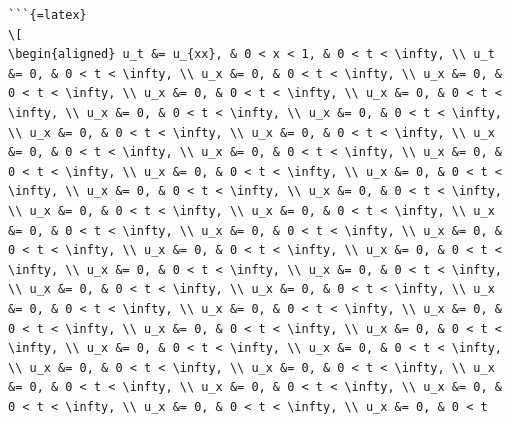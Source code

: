 \documentclass[
  ukrainian,
]{article}
\begin{document}
\begin{verbatim}
```{=latex}
\[
\begin{aligned} u_t &= u_{xx}, & 0 < x < 1, & 0 < t < \infty, \\ u_t &= 0, & 0 < t < \infty, \\ u_x &= 0, & 0 < t < \infty, \\ u_x &= 0, & 0 < t < \infty, \\ u_x &= 0, & 0 < t < \infty, \\ u_x &= 0, & 0 < t < \infty, \\ u_x &= 0, & 0 < t < \infty, \\ u_x &= 0, & 0 < t < \infty, \\ u_x &= 0, & 0 < t < \infty, \\ u_x &= 0, & 0 < t < \infty, \\ u_x &= 0, & 0 < t < \infty, \\ u_x &= 0, & 0 < t < \infty, \\ u_x &= 0, & 0 < t < \infty, \\ u_x &= 0, & 0 < t < \infty, \\ u_x &= 0, & 0 < t < \infty, \\ u_x &= 0, & 0 < t < \infty, \\ u_x &= 0, & 0 < t < \infty, \\ u_x &= 0, & 0 < t < \infty, \\ u_x &= 0, & 0 < t < \infty, \\ u_x &= 0, & 0 < t < \infty, \\ u_x &= 0, & 0 < t < \infty, \\ u_x &= 0, & 0 < t < \infty, \\ u_x &= 0, & 0 < t < \infty, \\ u_x &= 0, & 0 < t < \infty, \\ u_x &= 0, & 0 < t < \infty, \\ u_x &= 0, & 0 < t < \infty, \\ u_x &= 0, & 0 < t < \infty, \\ u_x &= 0, & 0 < t < \infty, \\ u_x &= 0, & 0 < t < \infty, \\ u_x &= 0, & 0 < t < \infty, \\ u_x &= 0, & 0 < t < \infty, \\ u_x &= 0, & 0 < t < \infty, \\ u_x &= 0, & 0 < t < \infty, \\ u_x &= 0, & 0 < t < \infty, \\ u_x &= 0, & 0 < t < \infty, \\ u_x &= 0, & 0 < t < \infty, \\ u_x &= 0, & 0 < t < \infty, \\ u_x &= 0, & 0 < t < \infty, \\ u_x &= 0, & 0 < t < \infty, \\ u_x &= 0, & 0 < t < \infty, \\ u_x &= 0, & 0 < t < \infty, \\ u_x &= 0, & 0 < t 
\end{verbatim}
\end{document}
